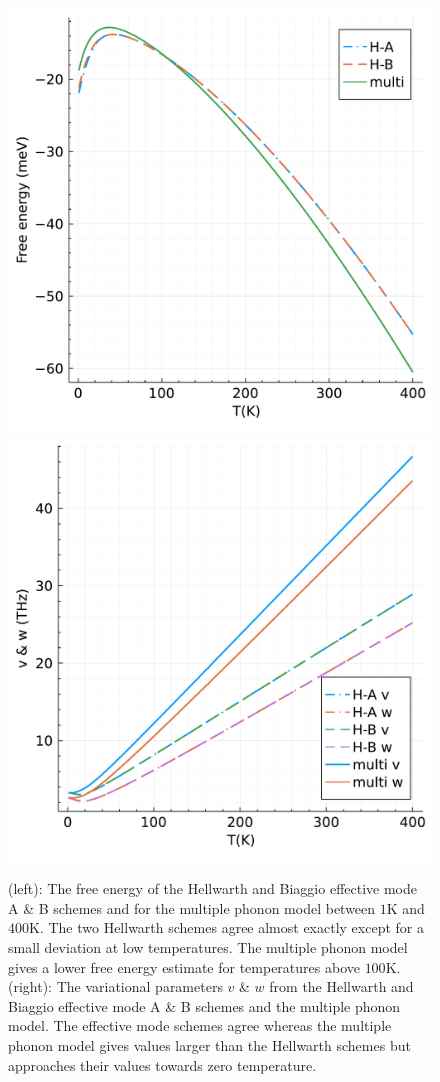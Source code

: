 \begin{figure}[t]
    \centering
    \includegraphics[width=.49\textwidth]{figures/free_energy_temp.pdf}
    \includegraphics[width=.49\textwidth]{figures/vw_temp.pdf}
    \caption{(left): The free energy of the Hellwarth and Biaggio effective mode A \& B schemes and for the multiple phonon model between $1$K and $400$K. The two Hellwarth schemes agree almost exactly except for a small deviation at low temperatures. The multiple phonon model gives a lower free energy estimate for temperatures above $100$K. (right): The variational parameters $v$ \& $w$ from the Hellwarth and Biaggio effective mode A \& B schemes and the multiple phonon model. The effective mode schemes agree whereas the multiple phonon model gives values larger than the Hellwarth schemes but approaches their values towards zero temperature.}
    \label{fig:multitheory}
\end{figure}

